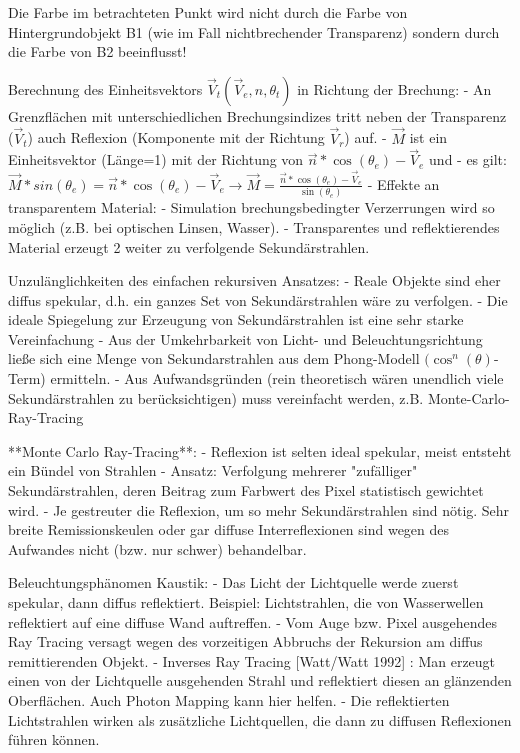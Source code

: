 \documentclass[10pt,landscape]{article}
\begin{document}
\begin{multicols}{3}
Die Farbe im betrachteten Punkt wird nicht durch die Farbe von Hintergrundobjekt B1 (wie im Fall nichtbrechender Transparenz) sondern durch die Farbe von B2 beeinflusst!

Berechnung des Einheitsvektors $\vec{V}_t(\vec{V}_e,n,\theta_t)$ in Richtung der Brechung:
- An Grenzflächen mit unterschiedlichen Brechungsindizes tritt neben der Transparenz ($\vec{V}_t$) auch Reflexion (Komponente mit der Richtung $\vec{V}_r$) auf.
- $\vec{M}$ ist ein Einheitsvektor (Länge=1) mit der Richtung von $\vec{n}*\cos(\theta_e)-\vec{V}_e$ und 
- es gilt: $\vec{M}*sin(\theta_e)=\vec{n}*\cos(\theta_e)-\vec{V}_e \rightarrow \vec{M}=\frac{\vec{n}*\cos(\theta_e)-\vec{V}_e}{\sin(\theta_e)}$
- Effekte an transparentem Material:
  - Simulation brechungsbedingter Verzerrungen wird so möglich (z.B. bei optischen Linsen, Wasser).
  - Transparentes und reflektierendes Material erzeugt 2 weiter zu verfolgende Sekundärstrahlen.



Unzulänglichkeiten des einfachen rekursiven Ansatzes:
- Reale Objekte sind eher diffus spekular, d.h. ein ganzes Set von Sekundärstrahlen wäre zu verfolgen.
- Die ideale Spiegelung zur Erzeugung von Sekundärstrahlen ist eine sehr starke Vereinfachung
- Aus der Umkehrbarkeit von Licht- und Beleuchtungsrichtung ließe sich eine Menge von Sekundarstrahlen aus dem Phong-Modell $(\cos^n(\theta)$-Term) ermitteln.
- Aus Aufwandsgründen (rein theoretisch wären unendlich viele Sekundärstrahlen zu berücksichtigen) muss vereinfacht werden, z.B. Monte-Carlo-Ray-Tracing

**Monte Carlo Ray-Tracing**:
- Reflexion ist selten ideal spekular, meist entsteht ein Bündel von Strahlen
- Ansatz: Verfolgung mehrerer "zufälliger" Sekundärstrahlen, deren Beitrag zum Farbwert des Pixel statistisch gewichtet wird.
- Je gestreuter die Reflexion, um so mehr Sekundärstrahlen sind nötig. Sehr breite Remissionskeulen oder gar diffuse Interreflexionen sind wegen des Aufwandes nicht (bzw. nur schwer) behandelbar.

Beleuchtungsphänomen Kaustik:
- Das Licht der Lichtquelle werde zuerst spekular, dann diffus reflektiert. Beispiel: Lichtstrahlen, die von Wasserwellen reflektiert auf eine diffuse Wand auftreffen.
- Vom Auge bzw. Pixel ausgehendes Ray Tracing versagt wegen des vorzeitigen Abbruchs der Rekursion am diffus remittierenden Objekt.
- Inverses Ray Tracing [Watt/Watt 1992] : Man erzeugt einen von der Lichtquelle ausgehenden Strahl und reflektiert diesen an glänzenden Oberflächen. Auch Photon Mapping kann hier helfen.
- Die reflektierten Lichtstrahlen wirken als zusätzliche Lichtquellen, die dann zu diffusen Reflexionen führen können.


\end{multicols}
\end{document}
